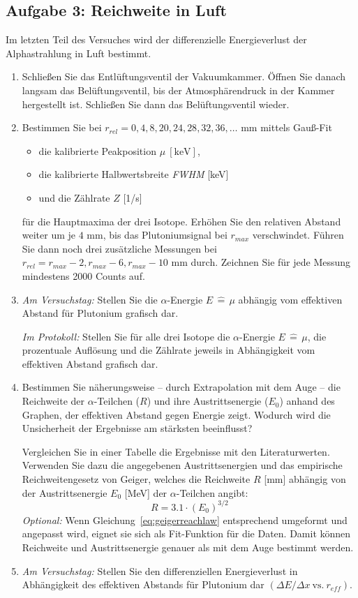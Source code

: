 \subsection{Aufgabe 3: Reichweite in Luft}
Im letzten Teil des Versuches wird der differenzielle Energieverlust der Alphastrahlung in Luft bestimmt.

\begin{enumerate}[label=\textbf{\alph*)}]
	\item Schließen Sie das Entlüftungsventil der Vakuumkammer. Öffnen Sie danach langsam das Belüftungsventil, bis der Atmosphärendruck in der Kammer hergestellt ist. Schließen Sie dann das Belüftungsventil wieder.
	\item Bestimmen Sie bei $r_{rel} = 0, 4, 8, 20, 24, 28, 32, 36, \dots$ mm mittels Gauß-Fit
	\begin{itemize}[nosep]
		\item die kalibrierte Peakposition $\mu\ [\text{keV}]$,
		\item die kalibrierte Halbwertsbreite \textit{FWHM} [keV]
		\item und die Zählrate $Z$ [1/s]
	\end{itemize}
	für die Hauptmaxima der drei Isotope. Erhöhen Sie den relativen Abstand weiter um je $4$ mm, bis das Plutoniumsignal bei $r_{max}$ verschwindet. Führen Sie dann noch drei zusätzliche Messungen bei $r_{rel} = r_{max} - 2, r_{max} - 6, r_{max} - 10$ mm durch. Zeichnen Sie für jede Messung mindestens 2000 Counts auf.
	\item \textit{Am Versuchstag:} Stellen Sie die $\alpha$-Energie $E\, \widehat{=}\, \mu$ abhängig vom effektiven Abstand für Plutonium grafisch dar.
	
	\textit{Im Protokoll:} Stellen Sie für alle drei Isotope die $\alpha$-Energie $E\, \widehat{=}\, \mu$, die prozentuale Auflösung und die Zählrate jeweils in Abhängigkeit vom effektiven Abstand grafisch dar.
	\item Bestimmen Sie näherungsweise -- durch Extrapolation mit dem Auge -- die Reichweite der $\alpha$-Teilchen ($R$) und ihre Austrittsenergie ($E_0$) anhand des Graphen, der effektiven Abstand gegen Energie zeigt. Wodurch wird die Unsicherheit der Ergebnisse am stärksten beeinflusst?
	
	Vergleichen Sie in einer Tabelle die Ergebnisse mit den Literaturwerten. Verwenden Sie dazu die angegebenen Austrittsenergien und das empirische Reichweitengesetz von Geiger, welches die Reichweite $R$ [mm] abhängig von der Austrittsenergie $E_0$ [MeV] der $\alpha$-Teilchen angibt:
	\begin{equation}\label{eq:geigerreachlaw}
		R = 3.1 \cdot \left(E_0\right)^{3/2}
	\end{equation}
	\textit{Optional:} Wenn Gleichung~\eqref{eq:geigerreachlaw} entsprechend umgeformt und angepasst wird, eignet sie sich als Fit-Funktion für die Daten. Damit können Reichweite und Austrittsenergie genauer als mit dem Auge bestimmt werden.
	\item \textit{Am Versuchstag:} Stellen Sie den differenziellen Energieverlust in Abhängigkeit des effektiven Abstands für Plutonium dar $\left( \Delta E/ \Delta x \ \text{vs.}\ r_{eff} \right)$.
	

\end{enumerate}
